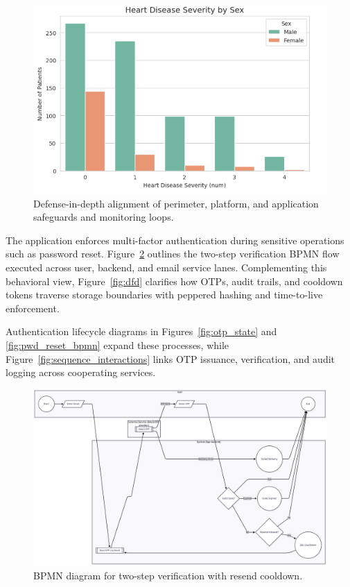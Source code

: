 \documentclass[conference]{IEEEtran}
\begin{document}
\begin{figure}[t]
  \centering
  \includegraphics[width=0.9\linewidth]{fig_3_13_should_be_this.png}
  \caption{Defense-in-depth alignment of perimeter, platform, and application safeguards and monitoring loops.}
  \label{fig:defense_layers}
\end{figure}

The application enforces multi-factor authentication during sensitive operations such as password reset. Figure~\ref{fig:bpmn} outlines the two-step verification BPMN flow executed across user, backend, and email service lanes. Complementing this behavioral view, Figure~\ref{fig:dfd} clarifies how OTPs, audit trails, and cooldown tokens traverse storage boundaries with peppered hashing and time-to-live enforcement.

Authentication lifecycle diagrams in Figures~\ref{fig:otp_state} and \ref{fig:pwd_reset_bpmn} expand these processes, while Figure~\ref{fig:sequence_interactions} links OTP issuance, verification, and audit logging across cooperating services.

\begin{figure}[t]
  \centering
  \includegraphics[width=0.9\linewidth]{bpmn_for_two_step_verification.png}
  \caption{BPMN diagram for two-step verification with resend cooldown.}
  \label{fig:bpmn}
\end{figure}
\end{document}
